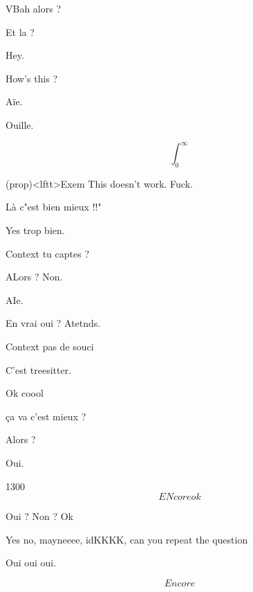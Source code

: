 \documentclass[a4paper, 10pt]{book}
\begin{document}
VBah alors ?

Et la ?

Hey.

How's this ?

Aïe.

Ouille.


\[
	\int_{0}^{\infty}

\]
\begin{tcb*}(prop)<lftt>{Exem}
	This doesn't work. Fuck.
\end{tcb*}

Là c"est bien mieux !!"

Yes trop bien.

Context tu captes ?

ALors ?
Non.

AIe.


En vrai oui ? Atetnds.

Context pas de souci

C'est treesitter.

Ok coool

ça va c'est mieux ?

Alors ?

Oui.

1300
\[
	ENcore ok

\]


Oui ? Non ? Ok

Yes no, mayneeee, idKKKK, can you repeat the question

Oui oui oui.

\[
	Encore
\]
\end{document}
